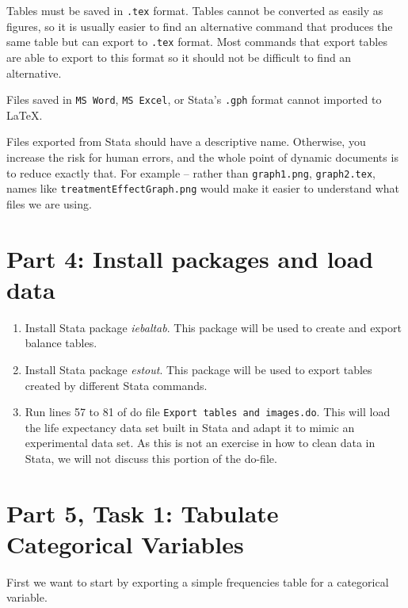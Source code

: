 \documentclass[]{article}
\begin{document}
Tables must be saved in \texttt{.tex} format. Tables cannot be converted as easily as figures, so it is usually easier to find an alternative command that produces the same table but can export to \texttt{.tex} format. Most commands that export tables are able to export to this format so it should not be difficult to find an alternative.

Files saved in \texttt{MS Word}, \texttt{MS Excel}, or Stata's \texttt{.gph} format cannot imported to {\LaTeX}.

Files exported from Stata should have a descriptive name. Otherwise, you increase the risk for human errors, and the whole point of dynamic documents is to reduce exactly that. For example -- rather than \texttt{graph1.png}, \texttt{graph2.tex}, names like \texttt{treatmentEffectGraph.png} would make it easier to understand what files we are using.

\section*{Part 4: Install packages and load data}

\begin{enumerate}
	\item Install Stata package \emph{iebaltab}. This package will be used to create and export balance tables.
	\item Install Stata package \emph{estout}. This package will be used to export tables created by different Stata commands.
	\item Run lines 57 to 81 of do file \texttt{Export tables and images.do}. This will load the life expectancy data set built in Stata and adapt it to mimic an experimental data set. As this is not an exercise in how to clean data in Stata, we will not discuss this portion of the do-file.
\end{enumerate}


\section*{Part 5, Task 1: Tabulate Categorical Variables}

First we want to start by exporting a simple frequencies table for a categorical variable. 
\end{document}
